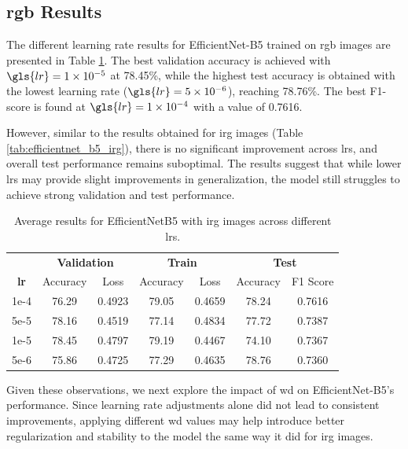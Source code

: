 \subsection{\gls{rgb} Results}
The different learning rate results for EfficientNet-B5 trained on \gls{rgb} images are 
presented in Table \ref{tab:efficientnetb5_lr_rgb}. The best validation accuracy is 
achieved with $\gls{lr}=1\times10^{-5}$ at 78.45\%, while the highest test accuracy is 
obtained with the lowest learning rate ($\gls{lr}=5\times10^{-6}$), reaching 78.76\%. The best 
F1-score is found at $\gls{lr}=1\times10^{-4}$ with a value of 0.7616.

However, similar to the results obtained for \gls{irg} images (Table \ref{tab:efficientnet_b5_irg}),
there is no significant improvement across \glspl{lr}, and overall test performance 
remains suboptimal. The results suggest that while lower \glspl{lr} may provide slight 
improvements in generalization, the model still struggles to achieve strong validation and 
test performance.

\begin{table}[h]
    \centering
    \renewcommand{\arraystretch}{1.3}
    \setlength{\tabcolsep}{8pt}
    \begin{tabular}{|c|cccccc|}
        \hline
        & \multicolumn{2}{c}{\textbf{Validation}} & \multicolumn{2}{c}{\textbf{Train}} & \multicolumn{2}{c|}{\textbf{Test}} \\
        \textbf{\gls{lr}} & Accuracy & Loss & Accuracy & Loss & Accuracy & F1 Score \\
        \hline
        1e-4   & 76.29  & 0.4923 & 79.05 & 0.4659 & 78.24 & 0.7616 \\
        5e-5   & 78.16  & 0.4519 & 77.14 & 0.4834 & 77.72 & 0.7387 \\
        1e-5   & 78.45  & 0.4797 & 79.19 & 0.4467 & 74.10 & 0.7367 \\
        5e-6   & 75.86  & 0.4725 & 77.29 & 0.4635 & 78.76 & 0.7360 \\
        \hline
    \end{tabular}
    \caption{Average results for EfficientNetB5 with \gls{irg} images across different \glspl{lr}.}
    \label{tab:efficientnetb5_lr_rgb}
\end{table}

Given these observations, we next explore the impact of \gls{wd} on EfficientNet-B5's 
performance. Since learning rate adjustments alone did not lead to consistent improvements, 
applying different \gls{wd} values may help introduce better regularization and stability to the model
the same way it did for \gls{irg} images.

